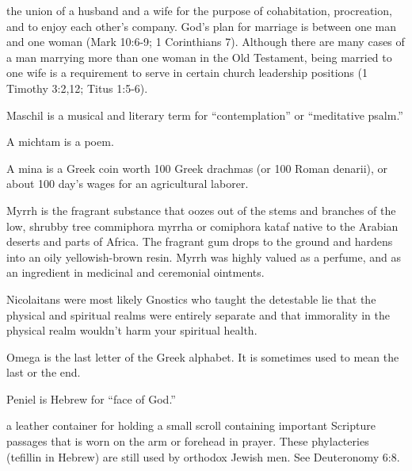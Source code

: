 {\par }{\ILIB the union of a husband and a wife for the purpose of cohabitation, procreation, and to enjoy each other’s company. God’s plan for marriage is between one man and one woman (Mark 10:6-9; 1 Corinthians 7). Although there are many cases of a man marrying more than one woman in the Old Testament, being married to one wife is a requirement to serve in certain church leadership positions (1 Timothy 3:2,12; Titus 1:5-6).
\par }{
\par }{\ILIB Maschil is a musical and literary term for “contemplation” or “meditative psalm.”
\par }{
\par }{\ILIB A michtam is a poem.
\par }{
\par }{\ILIB A mina is a Greek coin worth 100 Greek drachmas (or 100 Roman denarii), or about 100 day’s wages for an agricultural laborer.
\par }{
\par }{\ILIB Myrrh is the fragrant substance that oozes out of the stems and branches of the low, shrubby tree commiphora myrrha or comiphora kataf native to the Arabian deserts and parts of Africa. The fragrant gum drops to the ground and hardens into an oily yellowish-brown resin. Myrrh was highly valued as a perfume, and as an ingredient in medicinal and ceremonial ointments.
\par }{
\par }{\ILIB Nicolaitans were most likely Gnostics who taught the detestable lie that the physical and spiritual realms were entirely separate and that immorality in the physical realm wouldn’t harm your spiritual health.
\par }{
\par }{\ILIB Omega is the last letter of the Greek alphabet. It is sometimes used to mean the last or the end.
\par }{
\par }{\ILIB Peniel is Hebrew for “face of God.”
\par }{
\par }{\ILIB a leather container for holding a small scroll containing important Scripture passages that is worn on the arm or forehead in prayer. These phylacteries (tefillin in Hebrew) are still used by orthodox Jewish men. See Deuteronomy 6:8.
\par }{
}
